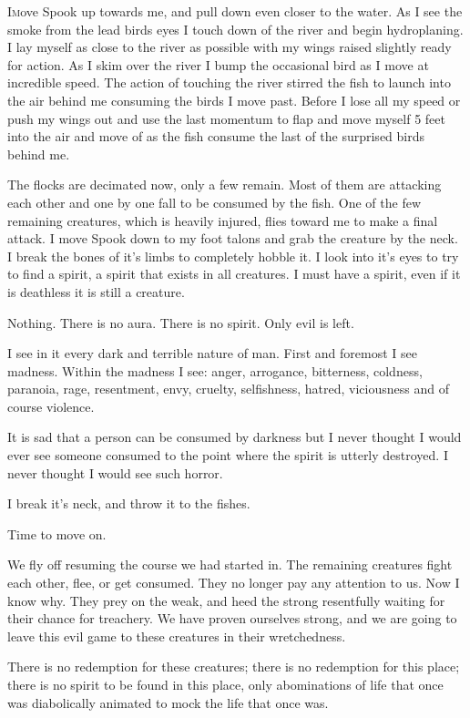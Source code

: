 \lettrine[lines=2,lraise=0]{I} move Spook up towards me, and pull down even closer to the water. As I see the smoke from the lead birds eyes I touch down of the river and begin hydroplaning. I lay myself as close to the river as possible with my wings raised slightly ready for action. As I skim over the river I bump the occasional bird as I move at incredible speed. The action of touching the river stirred the fish to launch into the air behind me consuming the birds I move past. Before I lose all my speed or push my wings out and use the last momentum to flap and move myself 5 feet into the air and move of as the fish consume the last of the surprised birds behind me.

The flocks are decimated now, only a few remain. Most of them are attacking each other and one by one fall to be consumed by the fish. One of the few remaining creatures, which is heavily injured, flies toward me to make a final attack. I move Spook down to my foot talons and grab the creature by the neck. I break the bones of it's limbs to completely hobble it. I look into it's eyes to try to find a spirit, a spirit that exists in all creatures. I must have a spirit, even if it is deathless it is still a creature.

Nothing. There is no aura. There is no spirit. Only evil is left.

I see in it every dark and terrible nature of man. First and foremost I see madness. Within the madness I see: anger, arrogance, bitterness, coldness, paranoia, rage, resentment, envy, cruelty, selfishness, hatred, viciousness and of course violence.

It is sad that a person can be consumed by darkness but I never thought I would ever see someone consumed to the point where the spirit is utterly destroyed. I never thought I would see such horror.

I break it's neck, and throw it to the fishes.

Time to move on.

We fly off resuming the course we had started in. The remaining creatures fight each other, flee, or get consumed. They no longer pay any attention to us. Now I know why. They prey on the weak, and heed the strong resentfully waiting for their chance for treachery. We have proven ourselves strong, and we are going to leave this evil game to these creatures in their wretchedness.

There is no redemption for these creatures; there is no redemption for this place; there is no spirit to be found in this place, only abominations of life that once was diabolically animated to mock the life that once was.


